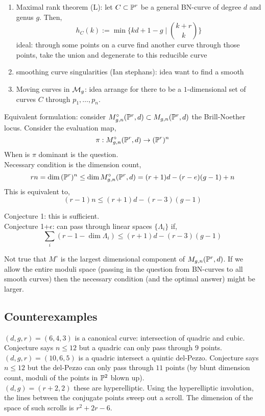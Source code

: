 \documentclass[12pt]{article}
\begin{document}
\begin{enumerate}
\item Maximal rank theorem (L): let $C \subset \P^r$ be a general BN-curve of degree $d$ and genus $g$. Then,
\[ h_C(k) := \min \{ kd + 1 - g \mid { k + r \choose k } \} \]
ideal: through some points on a curve find another curve through those points, take the union and degenerate to this reducible curve

\item smoothing curve singularities (Ian stephans): idea want to find a smooth 

\item Moving curves in $\M_g$: idea arrange for there to be a $1$-dimensional set of curves $C$ through $p_1, \dots, p_n$. 
\end{enumerate}

Equivalent formulation: consider $M^\circ_{g,n}(\P^r, d) \subset M_{g,n}(\P^r, d)$ the Brill-Noether locus. Consider the evaluation map,
\[ \pi : M^\circ_{g, n}(\P^r, d) \to (\P^r)^n \]
When is $\pi$ dominant is the question. 
\bigskip\\
Necessary condition is the dimension count,
\[ r n = \dim{(\P^r)^n} \le \dim{ M^\circ_{g,n}(\P^r, d) } = (r+1) d - (r-e)(g-1) + n \]
This is equivalent to,
\[ (r-1) n \le (r+1) d - (r-3)(g-1) \]

Conjecture 1: this is sufficient. 
\\
Conjecture 1+$\epsilon$: can pass through linear spaces $\{ \Lambda_i \}$ if,
\[ \sum_{i} (r-1 - \dim{\Lambda_i}) \le (r+1) d - (r-3)(g-1) \]

\begin{rmk}
Not true that $M^\circ$ is the largest dimensional component of $M_{g,n}(\P^r, d)$. If we allow the entire moduli space (passing in the question from BN-curves to all smooth curves) then the necessary condition (and the optimal answer) might be larger. 
\end{rmk}

\subsection{Counterexamples}

$(d,g,r) = (6,4,3)$ is a canonical curve: intersection of quadric and cubic. Conjecture says $n \le 12$ but a quadric can only pass through $9$ points. 
\\
$(d,g,r) = (10,6,5)$ is a quadric intersect a quintic del-Pezzo. Conjecture says $n \le 12$ but the del-Pezzo can only pass through $11$ points (by blunt dimension count, moduli of the points in $\P^2$ blown up). 
\\
$(d, g) = (r+2, 2)$ these are hyperelliptic. Using the hyperelliptic involution, the lines between the conjugate points sweep out a scroll. The dimension of the space of such scrolls is $r^2 + 2r - 6$. 
\end{document}
